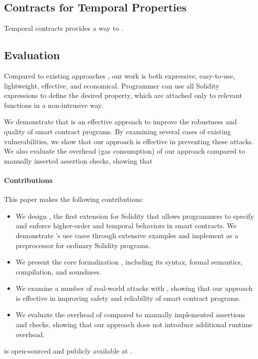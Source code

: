 
\subsection*{\textbf{Contracts for Temporal Properties}}

Temporal contracts provides a way to .

\subsection*{\textbf{Evaluation}}

Compared to existing approaches , our work is both expressive,
easy-to-use, lightweight, effective, and economical.
Programmer can use all Solidity expressions to define the desired property,
which are attached only to relevant functions in a non-intrusive way.

We demonstrate that \lang is an effective approach to improve the robustness
and quality of smart contract programs.
By examining several cases of existing vulnerabilities, we show that our
approach is effective in preventing these attacks.
We also evaluate the overhead (gas consumption) of our approach compared to
manually inserted assertion checks, showing that 






\paragraph{Contributions} This paper makes the following contributions:
\begin{itemize}
  \item We design \lang, the first extension for Solidity that allows programmers to
        specify and enforce higher-order and temporal behaviors in smart contracts.
        We demonstrate \lang's use cases through extensive examples and
        implement \lang as a preprocessor for ordinary Solidity programs.
  \item We present the core formalization \lang, including its syntax, formal
        semantics, compilation, and soundness.
  \item We examine a number of real-world attacks with \lang, showing that our
        approach is effective in improving safety and reliability of smart contract
        programs.
  \item We evaluate the overhead of \lang compared to manually implemented
        assertions and checks, showing that our approach does not introduce
        additional runtime overhead.
\end{itemize}

\lang is open-sourced and publicly available at .


